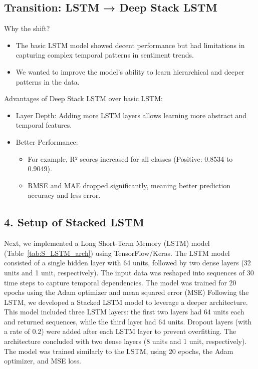 \documentclass[letterpaper]{article}
\begin{document}
\subsection{Transition: LSTM → Deep Stack LSTM}
Why the shift?
\begin{itemize}
    \item The basic LSTM model showed decent performance but had limitations in capturing complex temporal patterns in sentiment trends.
    \item We wanted to improve the model’s ability to learn hierarchical and deeper patterns in the data.
\end{itemize}
Advantages of Deep Stack LSTM over basic LSTM:
\begin{itemize}
    \item Layer Depth: Adding more LSTM layers allows learning more abstract and temporal features.
    \item Better Performance:
    \begin{itemize}
        \item For example, R² scores increased for all classes (Positive: 0.8534 to 0.9049).
        \item RMSE and MAE dropped significantly, meaning better prediction accuracy and less error.
    \end{itemize}
\end{itemize}

\subsection{4. Setup of Stacked LSTM}
Next, we implemented a Long Short-Term Memory (LSTM) model (Table~\ref{tab:S_LSTM_arch}) using TensorFlow/Keras. The LSTM model consisted of a single hidden layer with 64 units, followed by two dense layers (32 units and 1 unit, respectively). The input data was reshaped into sequences of 30 time steps to capture temporal dependencies. The model was trained for 20 epochs using the Adam optimizer and mean squared error (MSE)
Following the LSTM, we developed a Stacked LSTM model to leverage a deeper architecture. This model included three LSTM layers: the first two layers had 64 units each and returned sequences, while the third layer had 64 units. Dropout layers (with a rate of 0.2) were added after each LSTM layer to prevent overfitting. The architecture concluded with two dense layers (8 units and 1 unit, respectively). The model was trained similarly to the LSTM, using 20 epochs, the Adam optimizer, and MSE loss.
\end{document}
